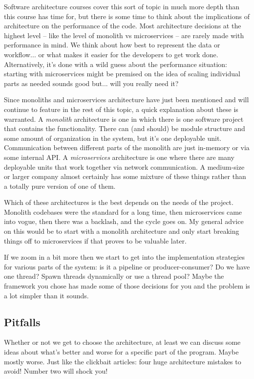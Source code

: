 Software architecture courses cover this sort of topic in much more depth than this course has time for, but there is some time to think about the implications of architecture on the performance of the code. Most architecture decisions at the highest level -- like the level of monolith vs microservices -- are rarely made with performance in mind. We think about how best to represent the data or workflow... or what makes it easier for the developers to get work done. Alternatively, it's done with a wild guess about the performance situation: starting with microservices might be premised on the idea of scaling individual parts as needed sounds good but... will you really need it?

Since monoliths and microservices architecture have just been mentioned and will continue to feature in the rest of this topic, a quick explanation about these is warranted. A \textit{monolith} architecture is one in which there is one software project that contains the functionality. There can (and should) be module structure and some amount of organization in the system, but it's one deployable unit. Communication between different parts of the monolith are just in-memory or via some internal API. A \textit{microservices} architecture is one where there are many deployable units that work together via network communication. A medium-size or larger company almost certainly has some mixture of these things rather than a totally pure version of one of them. 

Which of these architectures is the best depends on the needs of the project. Monolith codebases were the standard for a long time, then microservices came into vogue, then there was a backlash, and the cycle goes on. My general advice on this would be to start with a monolith architecture and only start breaking things off to microservices if that proves to be valuable later.

If we zoom in a bit more then we start to get into the implementation strategies for various parts of the system: is it a pipeline or producer-consumer? Do we have one thread? Spawn threads dynamically or use a thread pool? Maybe the framework you chose has made some of those decisions for you and the problem is a lot simpler than it sounds.

\subsection*{Pitfalls}

Whether or not we get to choose the architecture, at least we can discuss some ideas about what's better and worse for a specific part of the program. Maybe mostly worse. Just like the clickbait articles: four huge architecture mistakes to avoid! Number two will shock you! 

